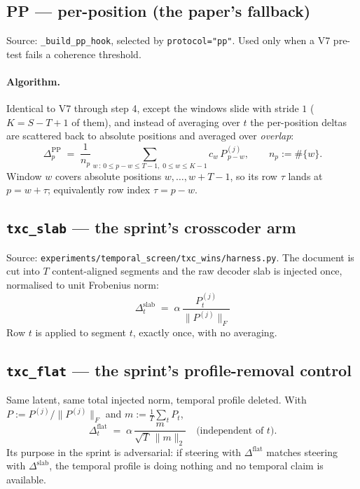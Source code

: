 \documentclass[11pt]{article}
\theoremstyle{definition}
\newcommand{\slab}{P}
\begin{document}
\subsection{PP --- per-position (the paper's fallback)}
\label{sec:pp}

Source: \verb|_build_pp_hook|, selected by \verb|protocol="pp"|. Used only when a V7 pre-test
fails a coherence threshold.

\paragraph{Algorithm.} Identical to V7 through step 4, except the windows slide with stride $1$
($K = S-T+1$ of them), and instead of averaging over $t$ the per-position deltas are scattered
back to absolute positions and averaged over \emph{overlap}:
\begin{equation}
  \Delta^{\mathrm{PP}}_p \;=\; \frac{1}{n_p}\sum_{w\,:\,0\le p-w\le T-1,\;0\le w\le K-1}
    c_w\,\slab^{(j)}_{\,p-w},
  \qquad
  n_p := \#\{w\} .
  \label{eq:pp-write}
\end{equation}
Window $w$ covers absolute positions $w,\dots,w+T-1$, so its row $\tau$ lands at $p = w+\tau$;
equivalently row index $\tau = p-w$.

\subsection{\texttt{txc\_slab} --- the sprint's crosscoder arm}

Source: \verb|experiments/temporal_screen/txc_wins/harness.py|. The document is cut into $T$
content-aligned segments and the raw decoder slab is injected once, normalised to unit Frobenius
norm:
\begin{equation}
  \boxed{\;\Delta^{\mathrm{slab}}_t \;=\; \alpha\,
  \frac{\slab^{(j)}_t}{\lVert \slab^{(j)}\rVert_F}\;}
  \label{eq:slab-write}
\end{equation}
Row $t$ is applied to segment $t$, exactly once, with no averaging.

\subsection{\texttt{txc\_flat} --- the sprint's profile-removal control}

Same latent, same total injected norm, temporal profile deleted. With
$\slab := \slab^{(j)}/\lVert\slab^{(j)}\rVert_F$ and $m := \tfrac1T\sum_t \slab_t$,
\begin{equation}
  \boxed{\;\Delta^{\mathrm{flat}}_t \;=\; \alpha\,\frac{m}{\sqrt{T}\,\lVert m\rVert_2}
  \quad\text{(independent of } t\text{)}.\;}
  \label{eq:flat-write}
\end{equation}
Its purpose in the sprint is adversarial: if steering with $\Delta^{\mathrm{flat}}$ matches
steering with $\Delta^{\mathrm{slab}}$, the temporal profile is doing nothing and no temporal
claim is available.
\end{document}
